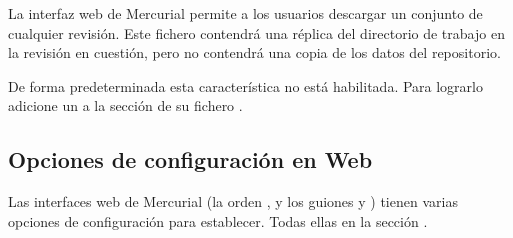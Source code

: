 La interfaz web de Mercurial permite a los usuarios descargar
un conjunto de cualquier revisión.  Este fichero contendrá una réplica
del directorio de trabajo en la revisión en cuestión, pero no
contendrá una copia de los datos del repositorio.

De forma predeterminada esta característica no está habilitada.  Para
lograrlo adicione un  a la sección 
de su fichero \hgrc.

\subsection{Opciones de configuración en Web}

Las interfaces web de Mercurial (la orden , y los guiones
 y ) tienen varias
opciones de configuración para establecer. Todas ellas en la sección
.
